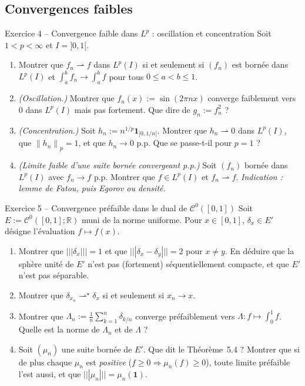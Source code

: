 \documentclass[11pt,a4paper]{article}
\newcommand{\R}{\mathbb{R}}
\newcommand{\norm}[1]{\left\|#1\right\|}
\newcommand{\opnorm}[1]{|\!|\!|#1|\!|\!|}
\newcommand{\Cz}{\mathcal{C}^0}
\newcommand{\wk}{\rightharpoonup}
\newcommand{\wks}{\rightharpoonup^{\!\star}}
\theoremstyle{definition}
\begin{document}
\subsection*{Convergences faibles}

\begin{exo}{Exercice 4 -- Convergence faible dans $L^p$ : oscillation et concentration}
Soit $1<p<\infty$ et $I=]0,1[$.
\begin{enumerate}[label=(\alph*)]
  \item Montrer que $f_n\wk f$ dans $L^p(I)$ si et seulement si $(f_n)$ est bornée dans $L^p(I)$ et $\int_a^bf_n\to\int_a^bf$ pour tous $0\le a<b\le1$.
  \item \emph{(Oscillation.)} Montrer que $f_n(x):=\sin(2\pi nx)$ converge faiblement vers $0$ dans $L^p(I)$ mais pas fortement. Que dire de $g_n:=f_n^2$ ?
  \item \emph{(Concentration.)} Soit $h_n:=n^{1/p}\mathbf 1_{]0,1/n[}$. Montrer que $h_n\wk0$ dans $L^p(I)$, que $\norm{h_n}_p=1$, et que $h_n\to0$ p.p. Que se passe-t-il pour $p=1$ ?
  \item \emph{(Limite faible d'une suite bornée convergeant p.p.)} Soit $(f_n)$ bornée dans $L^p(I)$ avec $f_n\to f$ p.p. Montrer que $f\in L^p(I)$ et $f_n\wk f$. \emph{Indication : lemme de Fatou, puis Egorov ou densité.}
\end{enumerate}
\end{exo}

\begin{exo}{Exercice 5 -- Convergence préfaible dans le dual de $\Cz([0,1])$}
Soit $E:=\Cz([0,1];\R)$ muni de la norme uniforme. Pour $x\in[0,1]$, $\delta_x\in E'$ désigne l'évaluation $f\mapsto f(x)$.
\begin{enumerate}[label=(\alph*)]
  \item Montrer que $\opnorm{\delta_x}=1$ et que $\opnorm{\delta_x-\delta_y}=2$ pour $x\ne y$. En déduire que la sphère unité de $E'$ n'est pas (fortement) séquentiellement compacte, et que $E'$ n'est pas séparable.
  \item Montrer que $\delta_{x_n}\wks\delta_x$ si et seulement si $x_n\to x$.
  \item Montrer que $\Lambda_n:=\frac1n\sum_{k=1}^n\delta_{k/n}$ converge préfaiblement vers $\Lambda:f\mapsto\int_0^1f$. Quelle est la norme de $\Lambda_n$ et de $\Lambda$ ?
  \item Soit $(\mu_n)$ une suite bornée de $E'$. Que dit le Théorème~5.4 ? Montrer que si de plus chaque $\mu_n$ est \emph{positive} ($f\ge0\Rightarrow\mu_n(f)\ge0$), toute limite préfaible l'est aussi, et que $\opnorm{\mu_n}=\mu_n(\mathbf 1)$.
\end{enumerate}
\end{exo}
\end{document}
